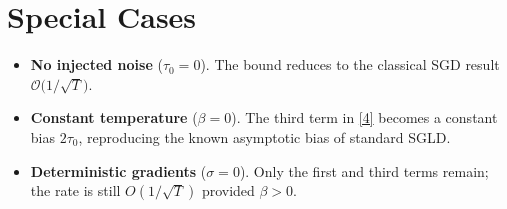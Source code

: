 \documentclass{article}
\begin{document}
\section*{Special Cases}
\begin{itemize}
\item \textbf{No injected noise} ($\tau_{0}=0$). The bound reduces to the classical SGD result
$\mathcal{O}\!\bigl(1/\sqrt{T}\bigr)$.
\item \textbf{Constant temperature} ($\beta=0$). The third term in \eqref{4} becomes a constant bias $2\tau_{0}$, reproducing the known asymptotic bias of standard SGLD.
\item \textbf{Deterministic gradients} ($\sigma=0$). Only the first and third terms remain; the rate is still $O(1/\sqrt{T})$ provided $\beta>0$.
\end{itemize}
\end{document}
